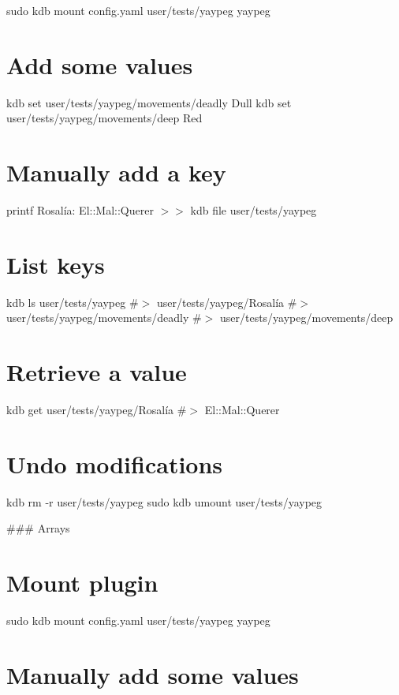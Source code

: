 sudo kdb mount config.\+yaml user/tests/yaypeg yaypeg

\section*{Add some values}

kdb set user/tests/yaypeg/movements/deadly \textquotesingle{}Dull\textquotesingle{} kdb set user/tests/yaypeg/movements/deep \textquotesingle{}Red\textquotesingle{}

\section*{Manually add a key}

printf \textquotesingle{}Rosalía\+: El\+::\+Mal\+::\+Querer\textquotesingle{} $>$$>$ {\ttfamily kdb file user/tests/yaypeg}

\section*{List keys}

kdb ls user/tests/yaypeg \#$>$ user/tests/yaypeg/\+Rosalía \#$>$ user/tests/yaypeg/movements/deadly \#$>$ user/tests/yaypeg/movements/deep

\section*{Retrieve a value}

kdb get user/tests/yaypeg/\+Rosalía \#$>$ El\+::\+Mal\+::\+Querer

\section*{Undo modifications}

kdb rm -\/r user/tests/yaypeg sudo kdb umount user/tests/yaypeg 
\begin{DoxyCode}
### Arrays
\end{DoxyCode}
 \section*{Mount plugin}

sudo kdb mount config.\+yaml user/tests/yaypeg yaypeg

\section*{Manually add some values}

